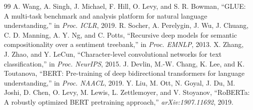 \documentclass[conference]{IEEEtran}
\begin{document}
\begin{thebibliography}{99}
 A. Wang, A. Singh, J. Michael, F. Hill, O. Levy, and S. R. Bowman, ``GLUE: A multi-task benchmark and analysis platform for natural language understanding,'' in \textit{Proc. ICLR}, 2019.
 R. Socher, A. Perelygin, J. Wu, J. Chuang, C. D. Manning, A. Y. Ng, and C. Potts, ``Recursive deep models for semantic compositionality over a sentiment treebank,'' in \textit{Proc. EMNLP}, 2013.
 X. Zhang, J. Zhao, and Y. LeCun, ``Character-level convolutional networks for text classification,'' in \textit{Proc. NeurIPS}, 2015.
 J. Devlin, M.-W. Chang, K. Lee, and K. Toutanova, ``BERT: Pre-training of deep bidirectional transformers for language understanding,'' in \textit{Proc. NAACL}, 2019.
 Y. Liu, M. Ott, N. Goyal, J. Du, M. Joshi, D. Chen, O. Levy, M. Lewis, L. Zettlemoyer, and V. Stoyanov, ``RoBERTa: A robustly optimized BERT pretraining approach,'' \textit{arXiv:1907.11692}, 2019.
\end{thebibliography}
\end{document}
